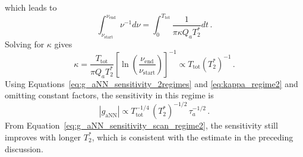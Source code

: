 which leads to
\begin{equation}
    \int_{\nu_\mathrm{start}}^{\nu_\mathrm{end}} \nu^{-1} d\nu = \int_{0}^{T_\mathrm{tot}} \frac{1}{\pi \kappa Q_a T_2^* } d t
    \,.\label{eq:scan_rate_regime1_integral}
\end{equation}
Solving for $\kappa$ gives
\begin{equation}
    \kappa = \frac{T_\mathrm{tot}}{\pi Q_a T_2^* } \left[\ln\left(\frac{\nu_\mathrm{end}}{\nu_\mathrm{start}}\right)\right]^{-1} \propto T_\mathrm{tot} \left(T_2^*\right)^{-1}
    \,.\label{eq:kappa_regime2}
\end{equation}
Using Equations~\eqref{eq:g_aNN_sensitivity_2regimes} and \eqref{eq:kappa_regime2} and omitting constant factors, the sensitivity in this regime is
\begin{equation}
    \left|g_{\mathrm{aNN}}\right| \propto
    T_{\mathrm{tot}}^{-1/4}\, \left(T_2^*\right)^{-1/2}\, \tau_a^{-1/2}
    \,. \label{eq:g_aNN_sensitivity_scan_regime2}
\end{equation}
From Equation~\eqref{eq:g_aNN_sensitivity_scan_regime2}, the sensitivity still improves with longer $T_2^*$, which is consistent with the estimate in the preceding discussion.




